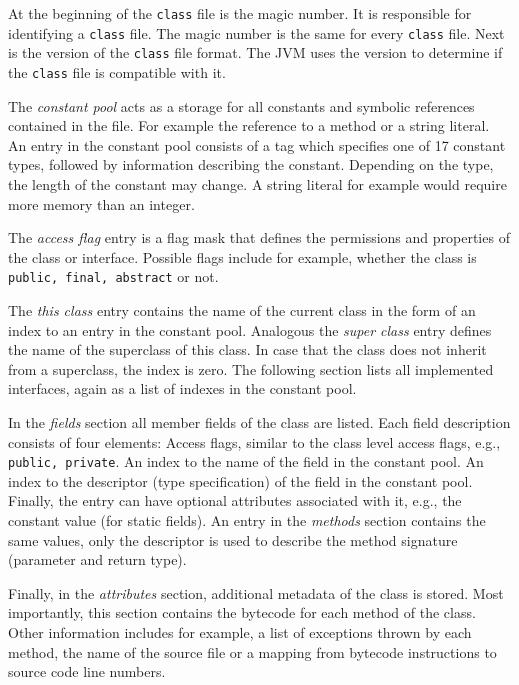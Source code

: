 At the beginning of the \texttt{class} file is the magic number. It is responsible for identifying a \texttt{class} file. The magic number is the same for every \texttt{class} file. Next is the version of the \texttt{class} file format. The JVM uses the version to determine if the \texttt{class} file is compatible with it.

The \textit{constant pool} acts as a storage for all constants and symbolic references contained in the file. For example the reference to a method or a string literal. An entry in the constant pool consists of a tag which specifies one of 17 constant types, followed by information describing the constant. Depending on the type, the length of the constant may change. A string literal for example would require more memory than an integer. 

The \textit{access flag} entry is a flag mask that defines the permissions and properties of the class or interface. Possible flags include for example, whether the class is \texttt{public, final, abstract} or not. 

The \textit{this class} entry contains the name of the current class in the form of an index to an entry in the constant pool. Analogous the \textit{super class} entry defines the name of the superclass of this class. In case that the class does not inherit from a superclass, the index is zero. The following section lists all implemented interfaces, again as a list of indexes in the constant pool. 

In the \textit{fields} section all member fields of the class are listed. Each field description consists of four elements: Access flags, similar to the class level access flags, e.g., \texttt{public, private}. An index to the name of the field in the constant pool. An index to the descriptor (type specification) of the field in the constant pool. Finally, the entry can have optional attributes associated with it, e.g., the constant value (for static fields). An entry in the \textit{methods} section contains the same values, only the descriptor is used to describe the method signature (parameter and return type).

Finally, in the \textit{attributes} section, additional metadata of the class is stored. Most importantly, this section contains the bytecode for each method of the class. Other information includes for example, a list of exceptions thrown by each method, the name of the source file or a mapping from bytecode instructions to source code line numbers.

